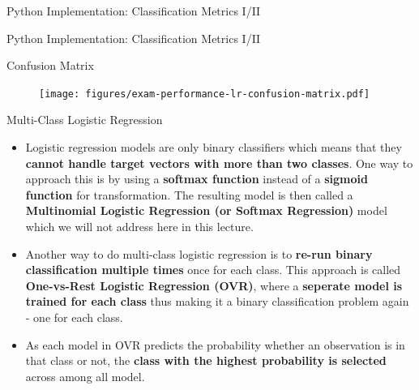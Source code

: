 \documentclass[main.tex]{subfiles}
\begin{document}
    \begin{frame}{Python Implementation: Classification Metrics I/II}
        
    \end{frame}

    \begin{frame}{Python Implementation: Classification Metrics I/II}
        
    \end{frame}

    \begin{frame}{Confusion Matrix}
        \begin{figure}
            \label{fig:exam-performance-lr-confusion-matrix}
            \texttt{[image: figures/exam-performance-lr-confusion-matrix.pdf]}
        \end{figure}        
    \end{frame}

    \begin{frame}{Multi-Class Logistic Regression}
        \begin{itemize}
            \item Logistic regression models are only binary classifiers which means that they \textbf{cannot handle target vectors with more than two classes}. One way to approach this is by using a \textbf{softmax function} instead of a \textbf{sigmoid function} for transformation. The resulting model is then called a \textbf{Multinomial Logistic Regression (or Softmax Regression)} model which we will not address here in this lecture.
            \item Another way to do multi-class logistic regression is to \textbf{re-run binary classification multiple times} once for each class. This approach is called \textbf{One-vs-Rest Logistic Regression (OVR)}, where a \textbf{seperate model is trained for each class} thus making it a binary classification problem again - one for each class.
            \item As each model in OVR predicts the probability whether an observation is in that class or not, the \textbf{class with the highest probability is selected} across among all model.
        \end{itemize}
    \end{frame}
\end{document}
